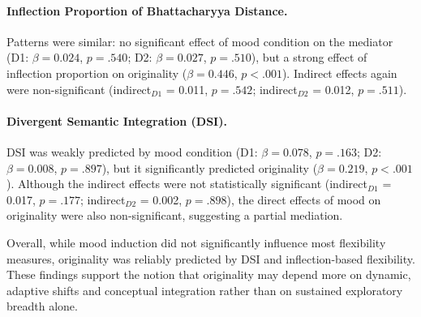 \documentclass[../MA_Thesis.tex]{subfiles}
\begin{document}
\paragraph{Inflection Proportion of Bhattacharyya Distance.}
Patterns were similar: no significant effect of mood condition on the mediator (D1: $\beta = 0.024$, $p = .540$; D2: $\beta = 0.027$, $p = .510$), but a strong effect of inflection proportion on originality ($\beta = 0.446$, $p < .001$). Indirect effects again were non-significant (indirect$_{D1}$ = 0.011, $p = .542$; indirect$_{D2}$ = 0.012, $p = .511$).

\paragraph{Divergent Semantic Integration (DSI).}
DSI was weakly predicted by mood condition (D1: $\beta = 0.078$, $p = .163$; D2: $\beta = 0.008$, $p = .897$), but it significantly predicted originality ($\beta = 0.219$, $p < .001$). Although the indirect effects were not statistically significant (indirect$_{D1}$ = 0.017, $p = .177$; indirect$_{D2}$ = 0.002, $p = .898$), the direct effects of mood on originality were also non-significant, suggesting a partial mediation.

Overall, while mood induction did not significantly influence most flexibility measures, originality was reliably predicted by DSI and inflection-based flexibility. These findings support the notion that originality may depend more on dynamic, adaptive shifts and conceptual integration rather than on sustained exploratory breadth alone.
\end{document}
